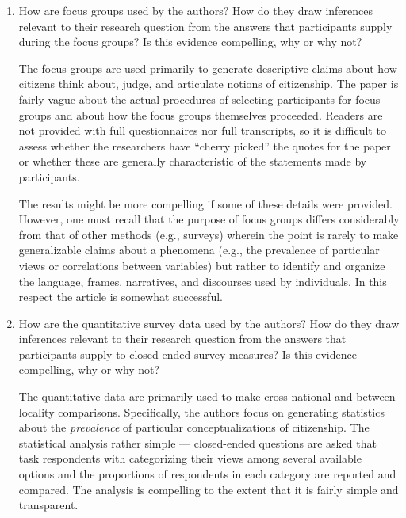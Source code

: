 \documentclass[a4paper]{exam}
\begin{document}
\begin{enumerate}
\begin{solution}
\end{solution}

\item How are focus groups used by the authors? How do they draw inferences relevant to their research question from the answers that participants supply during the focus groups? Is this evidence compelling, why or why not?

\begin{solution}

The focus groups are used primarily to generate descriptive claims about how citizens think about, judge, and articulate notions of citizenship. The paper is fairly vague about the actual procedures of selecting participants for focus groups and about how the focus groups themselves proceeded. Readers are not provided with full questionnaires nor full transcripts, so it is difficult to assess whether the researchers have ``cherry picked'' the quotes for the paper or whether these are generally characteristic of the statements made by participants.

The results might be more compelling if some of these details were provided. However, one must recall that the purpose of focus groups differs considerably from that of other methods (e.g., surveys) wherein the point is rarely to make generalizable claims about a phenomena (e.g., the prevalence of particular views or correlations between variables) but rather to identify and organize the language, frames, narratives, and discourses used by individuals. In this respect the article is somewhat successful.

\end{solution}

\item How are the quantitative survey data used by the authors? How do they draw inferences relevant to their research question from the answers that participants supply to closed-ended survey measures? Is this evidence compelling, why or why not?

\begin{solution}

The quantitative data are primarily used to make cross-national and between-locality comparisons. Specifically, the authors focus on generating statistics about the \textit{prevalence} of particular conceptualizations of citizenship. The statistical analysis rather simple --- closed-ended questions are asked that task respondents with categorizing their views among several available options and the proportions of respondents in each category are reported and compared. The analysis is compelling to the extent that it is fairly simple and transparent.


\end{solution}
\end{enumerate}
\end{document}
